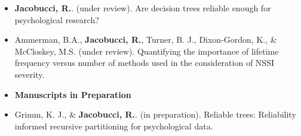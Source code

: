 \documentclass[letterpaper,10pt]{article}
\begin{document}
\begin{itemize}
%
\item[] \textbf{Jacobucci, R.}. (under review). Are decision trees reliable enough for psychological research?
%
\item[] Ammerman, B.A., \textbf{Jacobucci, R.}, Turner, B. J., Dixon-Gordon, K., \& McCloskey, M.S. (under review). Quantifying the importance of lifetime frequency versus number of methods used in the consideration of NSSI severity.
%
\item{\textbf{\large{Manuscripts in Preparation}}} 
%
\item[] Grimm, K. J., \& \textbf{Jacobucci, R.}. (in preparation). Reliable trees: Reliability informed recursive partitioning for psychological data. 
%
%
%

%
%
%


\end{itemize} 
\end{document}
